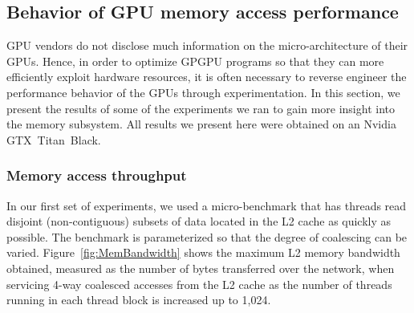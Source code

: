 \subsection{Behavior of GPU memory access performance}  \label{GPUBehavior}

GPU vendors do not disclose much information on the micro-architecture of their GPUs.
Hence, in order to optimize GPGPU programs so that they can more efficiently exploit hardware
resources, it is often necessary to reverse engineer the performance behavior of the GPUs through
experimentation.
In this section, we present the results of some of the experiments we ran to gain more insight into the memory subsystem.
All results we present here were obtained on an Nvidia GTX~Titan~Black.


\subsubsection{Memory access throughput}
In our first set of experiments, we used a micro-benchmark that has threads read disjoint (non-contiguous) subsets of data
located in the L2 cache as quickly as possible.
The benchmark is parameterized so that the degree of coalescing can be varied.
Figure~\ref{fig:MemBandwidth} shows the maximum L2 memory bandwidth obtained, measured as
the number of bytes transferred over the network, when servicing 4-way coalesced
accesses from the L2 cache as the number of threads running in each thread block is increased up to
1,024.



